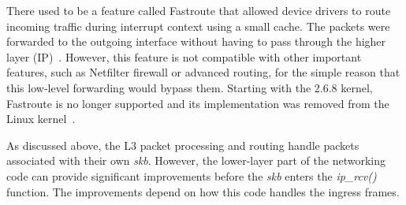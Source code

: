 There used to be a feature called Fastroute that allowed device drivers to route incoming traffic during
interrupt context using a small cache.
The packets were forwarded to the outgoing interface
without having to pass through the higher layer (IP)~\cite{linux-kernel-networking}.
However, this feature is not compatible with other important features, such as Netfilter firewall or advanced routing,
for the simple reason that this low-level forwarding would bypass them.
Starting with the 2.6.8 kernel, Fastroute is no longer supported and
its implementation was removed from the Linux kernel~\cite{linux-kernel-networking}.

As discussed above, the L3 packet processing and routing handle packets associated with their own {\it{skb}}.
However, the lower-layer part of the networking code can provide significant improvements
before the {\it{skb}} enters the {\it{ip\_rcv()}} function.
The improvements depend on how this code handles the ingress frames.
